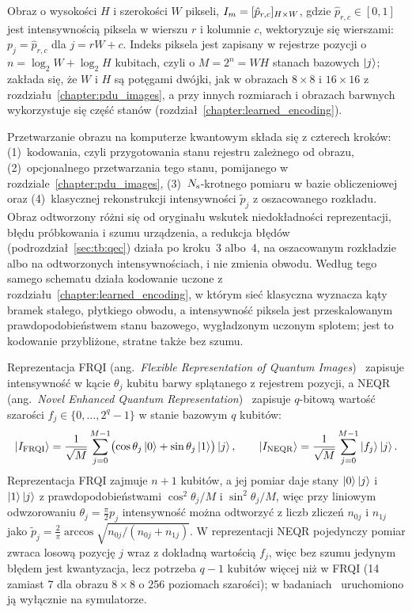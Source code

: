 Obraz o wysokości $H$ i szerokości $W$ pikseli, $I_m=[\hat{p}_{r,c}]_{H\times W}$, gdzie $\hat{p}_{r,c}\in[0,1]$ jest intensywnością piksela w wierszu $r$ i kolumnie $c$, wektoryzuje się wierszami: $p_j=\hat{p}_{r,c}$ dla $j=rW+c$.
Indeks piksela jest zapisany w rejestrze pozycji o $n=\operatorname{log}_2W+\operatorname{log}_2H$ kubitach, czyli o $M=2^n=WH$ stanach bazowych $\ket{j}$; zakłada się, że $W$ i $H$ są potęgami dwójki, jak w obrazach $8\times8$ i $16\times16$ z rozdziału~\ref{chapter:pdu_images}, a przy innych rozmiarach i obrazach barwnych wykorzystuje się część stanów (rozdział~\ref{chapter:learned_encoding}).

Przetwarzanie obrazu na komputerze kwantowym składa się z czterech kroków: (1)~kodowania, czyli przygotowania stanu rejestru zależnego od obrazu, (2)~opcjonalnego przetwarzania tego stanu, pomijanego w rozdziale~\ref{chapter:pdu_images}, (3)~$N_{\mathrm{s}}$-krotnego pomiaru w bazie obliczeniowej oraz (4)~klasycznej rekonstrukcji intensywności $\tilde{p}_j$ z oszacowanego rozkładu.
Obraz odtworzony różni się od oryginału wskutek niedokładności reprezentacji, błędu próbkowania i szumu urządzenia, a redukcja błędów (podrozdział~\ref{sec:tb:qec}) działa po kroku~3 albo~4, na oszacowanym rozkładzie albo na odtworzonych intensywnościach, i nie zmienia obwodu.
Według tego samego schematu działa kodowanie uczone z rozdziału~\ref{chapter:learned_encoding}, w którym sieć klasyczna wyznacza kąty bramek stałego, płytkiego obwodu, a intensywność piksela jest przeskalowanym prawdopodobieństwem stanu bazowego, wygładzonym uczonym splotem; jest to kodowanie przybliżone, stratne także bez szumu.

Reprezentacja FRQI (ang.\ \emph{Flexible Representation of Quantum Images})~\cite{frqi} zapisuje intensywność w kącie $\theta_j$ kubitu barwy splątanego z rejestrem pozycji, a NEQR (ang.\ \emph{Novel Enhanced Quantum Representation})~\cite{neqr} zapisuje $q$-bitową wartość szarości $f_j\in\{0,\dots,2^q-1\}$ w stanie bazowym $q$ kubitów:
\begin{equation}\label{eq:tb:qimg:frqi}
\ket{I_{\mathrm{FRQI}}}=\frac{1}{\sqrt{M}}\sum_{j=0}^{M-1}\bigl(\cos\theta_j\ket{0}+\sin\theta_j\ket{1}\bigr)\ket{j},
\qquad
\ket{I_{\mathrm{NEQR}}}=\frac{1}{\sqrt{M}}\sum_{j=0}^{M-1}\ket{f_j}\ket{j}.
\end{equation}
Reprezentacja FRQI zajmuje $n+1$ kubitów, a jej pomiar daje stany $\ket{0}\ket{j}$ i $\ket{1}\ket{j}$ z prawdopodobieństwami $\cos^2\theta_j/M$ i $\sin^2\theta_j/M$, więc przy liniowym odwzorowaniu $\theta_j=\frac{\pi}{2}p_j$ intensywność można odtworzyć z liczb zliczeń $n_{0j}$ i $n_{1j}$ jako $\tilde{p}_j=\frac{2}{\pi}\arccos\sqrt{n_{0j}/(n_{0j}+n_{1j})}$.
W reprezentacji NEQR pojedynczy pomiar zwraca losową pozycję $j$ wraz z dokładną wartością $f_j$, więc bez szumu jedynym błędem jest kwantyzacja, lecz potrzeba $q-1$ kubitów więcej niż w FRQI (14 zamiast 7 dla obrazu $8\times8$ o 256 poziomach szarości); w badaniach~\cite{werner_data_loss_2023} uruchomiono ją wyłącznie na symulatorze.

